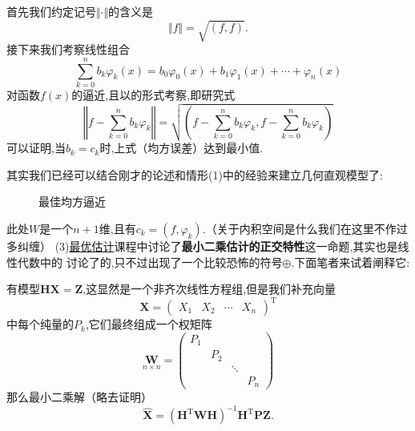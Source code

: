 \documentclass[cn,10pt,citestyle=gb7714-2015,bibstyle=gb7714-2015]{elegantbook}
\begin{document}
    \begin{proposition}
        首先我们约定记号$\Vert\cdot\Vert$的含义是
        \[
            \Vert f\Vert=\sqrt{(f,f)}.
        \]
        接下来我们考察线性组合
        \[
            \sum_{k=0}^n b_k\varphi_k(x)=b_0\varphi_0(x)+b_1\varphi_1(x)+\cdots+\varphi_n(x)  
        \]
        对函数$f(x)$的逼近,且以的形式考察,即研究式
        \[
            \left\Vert f-\sum_{k=0}^n b_k\varphi_k\right\Vert=\sqrt{\left(f-\sum_{k=0}^n b_k\varphi_k,f-\sum_{k=0}^n b_k\varphi_k\right)}
        \]
        可以证明,当$b_k=c_k$时,上式（均方误差）达到最小值.
    \end{proposition}
    其实我们已经可以结合刚才的论述和情形(1)中的经验来建立几何直观模型了:
    \begin{figure}[H]
        \centering
        \caption{最佳均方逼近}
    \end{figure}
    \textcolor{magenta}{\HandRight}此处$W$是一个$n+1$维,且有$c_k=(f,\varphi_k)$.（关于内积空间是什么我们在这里不作过多纠缠）
    (3)\uline{最优估计}课程中讨论了\textbf{最小二乘估计的正交特性}这一命题,其实也是线性代数中的
    讨论了的,只不过出现了一个比较恐怖的符号$\oplus $.下面笔者来试着阐释它:
    \begin{proposition}[更一般的最小二乘解]
        有模型$\bm{H}\bm{X}=\bm{Z}$,这显然是一个非齐次线性方程组,但是我们补充向量
        \[
            \bm{X}=\begin{pmatrix}
                X_1&X_2&\cdots&X_n
            \end{pmatrix}^\mathrm{T}
        \]
        中每个纯量的$P_k$,它们最终组成一个权矩阵
        \[
            \underset{n\times n}{\bm{W}}=\begin{pmatrix}
                P_1& & & \\
                 &P_2 & & \\
                 & & \ddots & \\
                 & & &P_n
            \end{pmatrix}  
        \]
        那么最小二乘解（略去证明）
        \[
            \hat{\bm{X}}=(\bm{H}^\mathrm{T}\bm{W}\bm{H})^{-1}\bm{H}^\mathrm{T}\bm{P}\bm{Z}.
        \]
    \end{proposition}
\end{document}
